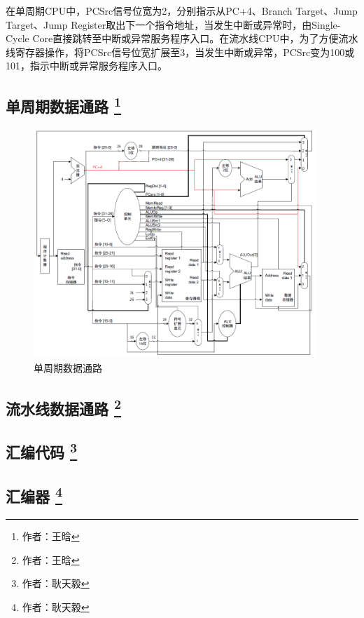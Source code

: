 \documentclass{article}
\begin{document}
            在单周期CPU中，PCSrc信号位宽为2，分别指示从PC+4、Branch Target、Jump Target、Jump Register取出下一个指令地址，当发生中断或异常时，由Single-Cycle Core直接跳转至中断或异常服务程序入口。在流水线CPU中，为了方便流水线寄存器操作，将PCSrc信号位宽扩展至3，当发生中断或异常，PCSrc变为100或101，指示中断或异常服务程序入口。
            
        \subsection{单周期数据通路 \protect\footnote{作者：王晗}}
            \begin{figure}[H]
                \centering
                \includegraphics[width=0.95\textwidth]{images/singlecycle_datapath.png}
                \caption{\label{fig:singlecycle_datapath}单周期数据通路}
            \end{figure}
            
        \subsection{流水线数据通路 \protect\footnote{作者：王晗}}

        \subsection{汇编代码 \protect\footnote{作者：耿天毅}}
        
        \subsection{汇编器 \protect\footnote{作者：耿天毅}}
\end{document}
